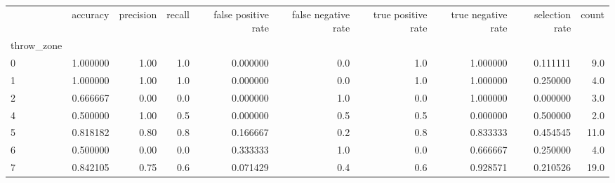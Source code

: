 \begin{tabular}{lrrrrrrrrr}
\toprule
{} &  accuracy &  precision &  recall &  false positive rate &  false negative rate &  true positive rate &  true negative rate &  selection rate &  count \\
throw\_zone &           &            &         &                      &                      &                     &                     &                 &        \\
\midrule
0          &  1.000000 &       1.00 &     1.0 &             0.000000 &                  0.0 &                 1.0 &            1.000000 &        0.111111 &    9.0 \\
1          &  1.000000 &       1.00 &     1.0 &             0.000000 &                  0.0 &                 1.0 &            1.000000 &        0.250000 &    4.0 \\
2          &  0.666667 &       0.00 &     0.0 &             0.000000 &                  1.0 &                 0.0 &            1.000000 &        0.000000 &    3.0 \\
4          &  0.500000 &       1.00 &     0.5 &             0.000000 &                  0.5 &                 0.5 &            0.000000 &        0.500000 &    2.0 \\
5          &  0.818182 &       0.80 &     0.8 &             0.166667 &                  0.2 &                 0.8 &            0.833333 &        0.454545 &   11.0 \\
6          &  0.500000 &       0.00 &     0.0 &             0.333333 &                  1.0 &                 0.0 &            0.666667 &        0.250000 &    4.0 \\
7          &  0.842105 &       0.75 &     0.6 &             0.071429 &                  0.4 &                 0.6 &            0.928571 &        0.210526 &   19.0 \\
\bottomrule
\end{tabular}
